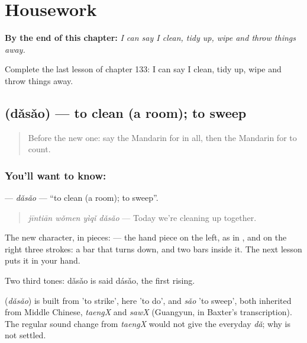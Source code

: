 
\chapter{Housework}
\label{ch:zh-housework}

\begin{chapteropening}
\textbf{By the end of this chapter:} \emph{I can say I clean, tidy up, wipe and throw things away.}

Complete the last lesson of chapter 133: I can say I clean, tidy up, wipe and throw things away.
\end{chapteropening}

\section[\texorpdfstring{\zh{打扫} (dǎsǎo)}{打扫 (dǎsǎo)}]{ (dǎsǎo) — to clean (a room); to sweep}

\label{lesson:ZH-C133-dasao}



\begin{quote}
Before the new one: say the Mandarin for in all, then the Mandarin for to count.
\end{quote}

\subsection*{You'll want to know: }
\textbf{} — \emph{dǎsǎo} — \textquotedblleft{}to clean (a room); to sweep\textquotedblright{}.

\begin{quote}
\textbf{} \emph{jīntiān wǒmen yìqǐ dǎsǎo} — Today we're cleaning up together.
\end{quote}

The new character, in pieces:  — the hand piece on the left, as in , and on the right three strokes: a bar that turns down, and two bars inside it. The next lesson puts it in your hand.

Two third tones: dǎsǎo is said dásǎo, the first rising.

\begin{cousinweb}
\textbf{} (\emph{dǎsǎo}) is built from  'to strike', here 'to do', and \emph{sǎo} 'to sweep', both inherited from Middle Chinese, \emph{taengX} and \emph{sawX} (Guangyun, in Baxter's transcription). The regular sound change from \emph{taengX} would not give the everyday \emph{dǎ}; why is not settled.
\end{cousinweb}

